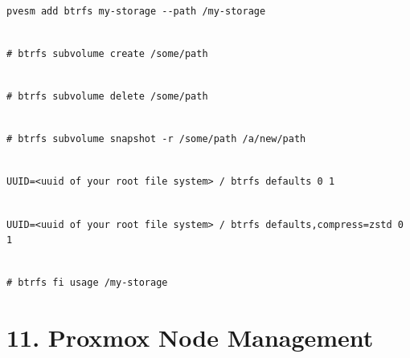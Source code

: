 \begin{lstlisting}

pvesm add btrfs my-storage --path /my-storage

\end{lstlisting}

\begin{lstlisting}

# btrfs subvolume create /some/path

\end{lstlisting}

\begin{lstlisting}

# btrfs subvolume delete /some/path

\end{lstlisting}

\begin{lstlisting}

# btrfs subvolume snapshot -r /some/path /a/new/path

\end{lstlisting}

\begin{lstlisting}

UUID=<uuid of your root file system> / btrfs defaults 0 1

\end{lstlisting}

\begin{lstlisting}

UUID=<uuid of your root file system> / btrfs defaults,compress=zstd 0 1

\end{lstlisting}

\begin{lstlisting}

# btrfs fi usage /my-storage

\end{lstlisting}

\begin{table}[htbp]

\centering

\begin{tabular}

\end{tabular}

\end{table}


\section{11. Proxmox Node Management}

